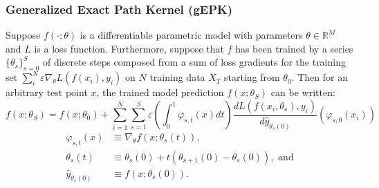 \begin{frame}
  \frametitle{Generalized Exact Path Kernel (gEPK)}
      
\begin{theorem}
\label{thm:ekr}
Suppose $f(\cdot; \theta)$ is a differentiable parametric model with parameters $\theta \in \mathbb{R}^M$ and $L$ is a loss function. Furthermore, suppose that $f$ has been trained by a series $\{\theta_s\}_{s=0}^S$ of discrete steps composed from a sum of loss gradients for the training set $ \sum_{i}^N \varepsilon \nabla_\theta L(f(x_i), y_i)$ on $N$ training data $X_T$ starting from $\theta_0$. Then for an arbitrary test point $x$, the trained model prediction $f(x; \theta_S)$ can be written:
\begin{equation}
f(x; \theta_S) = f(x; \theta_0) + \sum_{i=1}^N \sum_{s=1}^S \varepsilon \left(\int_0^1 \varphi_{s,t}(x) dt\right) \dfrac{dL(f(x_i, \theta_s), y_i)}{d \hat y_{\theta_s(0)}} \left(\varphi_{s, 0}(x_i)\right)
\label{exact}
\end{equation}
\begin{align}
    \varphi_{s,t}(x) &\equiv \nabla_\theta f(x; \theta_s(t)), \\
    \theta_s(t) &\equiv \theta_s(0) + t(\theta_{s+1}(0)-\theta_s(0)), \text{ and}\\
    \hat y_{\theta_s(0)} &\equiv f(x; \theta_s(0)).
\end{align}
\end{theorem}
\end{frame}

